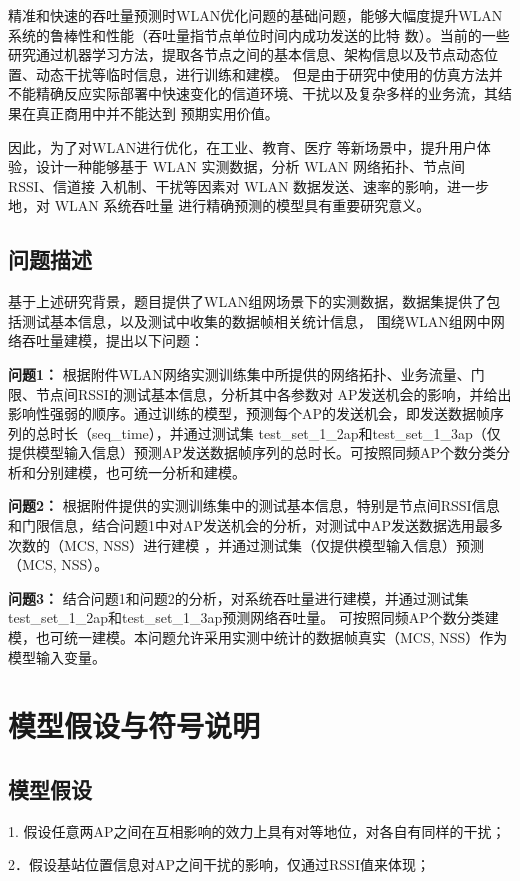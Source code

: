 \documentclass[bwprint]{gmcmthesis}
\begin{document}
 精准和快速的吞吐量预测时WLAN优化问题的基础问题，能够大幅度提升WLAN系统的鲁棒性和性能（吞吐量指节点单位时间内成功发送的比特
 数）。当前的一些研究通过机器学习方法，提取各节点之间的基本信息、架构信息以及节点动态位置、动态干扰等临时信息，进行训练和建模。
 但是由于研究中使用的仿真方法并不能精确反应实际部署中快速变化的信道环境、干扰以及复杂多样的业务流，其结果在真正商用中并不能达到
 预期实用价值。

 因此，为了对WLAN进行优化，在工业、教育、医疗
 等新场景中，提升用户体验，设计一种能够基于 WLAN 实测数据，分析 WLAN 网络拓扑、节点间 RSSI、信道接
 入机制、干扰等因素对 WLAN 数据发送、速率的影响，进一步地，对 WLAN 系统吞吐量
 进行精确预测的模型具有重要研究意义。
 \subsection{问题描述}
 基于上述研究背景，题目提供了WLAN组网场景下的实测数据，数据集提供了包括测试基本信息，以及测试中收集的数据帧相关统计信息，
 围绕WLAN组网中网络吞吐量建模，提出以下问题：

 \textbf{问题1：}
 根据附件WLAN网络实测训练集中所提供的网络拓扑、业务流量、门限、节点间RSSI的测试基本信息，分析其中各参数对
 AP发送机会的影响，并给出影响性强弱的顺序。通过训练的模型，预测每个AP的发送机会，即发送数据帧序列的总时长（seq\_time），并通过测试集 test\_set\_1\_2ap和test\_set\_1\_3ap（仅提供模型输入信息）预测AP发送数据帧序列的总时长。可按照同频AP个数分类分析和分别建模，也可统一分析和建模。

 \textbf{问题2：}
 根据附件提供的实测训练集中的测试基本信息，特别是节点间RSSI信息和门限信息，结合问题1中对AP发送机会的分析，对测试中AP发送数据选用最多次数的（MCS, NSS）进行建模
 ，并通过测试集（仅提供模型输入信息）预测（MCS, NSS）。
 
 \textbf{问题3：}
 结合问题1和问题2的分析，对系统吞吐量进行建模，并通过测试集test\_set\_1\_2ap和test\_set\_1\_3ap预测网络吞吐量。
 可按照同频AP个数分类建模，也可统一建模。本问题允许采用实测中统计的数据帧真实（MCS, NSS）作为模型输入变量。

 
 \newpage
 \section{模型假设与符号说明}
    \subsection{模型假设}
 1.	假设任意两AP之间在互相影响的效力上具有对等地位，对各自有同样的干扰；
 
 2．假设基站位置信息对AP之间干扰的影响，仅通过RSSI值来体现；
 
\end{document}
